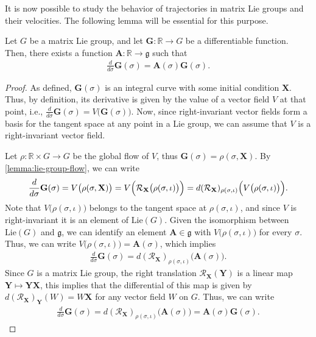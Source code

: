 It is now possible to study the behavior of trajectories in matrix Lie groups and their velocities. The following lemma will be essential for this purpose.
\begin{lemma} \label{lemma:derivative-lie-element-H-parallelizable} Let $G$ be a matrix Lie group, and let $\mathbf{G}:\mathbb{R}\to G$ be a differentiable function. Then, there exists a function $\mathbf{A}:\mathbb{R} \to \mathfrak{g}$ such that 
\begin{align}
    \frac{d}{d\sigma} \mathbf{G}(\sigma) = \mathbf{A}(\sigma) \mathbf{G}(\sigma). \label{eq:derivative-lie-element-H-parallelizable}
\end{align}

\end{lemma}
\begin{proof}
    As defined, $\mathbf{G}(\sigma)$ is an integral curve with some initial condition $\mathbf{X}$. Thus, by definition, its derivative is given by the value of a vector field $V$ at that point, i.e., $\frac{d}{d\sigma}\mathbf{G}(\sigma) = V\bigl(\mathbf{G}(\sigma)\bigr)$. Now, since right-invariant vector fields form a basis for the tangent space at any point in a Lie group, we can assume that $V$ is a right-invariant vector field.

    Let $\rho: \mathbb{R} \times G \to G$ be the global flow of $V$, thus $\mathbf{G}(\sigma) = \rho(\sigma, \mathbf{X})$. By \cref{lemma:lie-group-flow}, we can write
    \begin{align}
        \frac{d}{d\sigma} \mathbf{G}(\sigma) = V\bigl(\rho(\sigma, \mathbf{X})\bigr) = V\Bigl(\mathcal{R}_{\mathbf{X}}\bigl(\rho(\sigma, \iota)\bigr)\Bigr) = d(\mathcal{R}_{\mathbf{X}})_{\rho(\sigma, \iota)}\Bigl(V\bigl(\rho(\sigma, \iota)\bigr)\Bigr).
    \end{align}
    Note that $V\bigl(\rho(\sigma, \iota)\bigr)$ belongs to the tangent space at $\rho(\sigma, \iota)$, and since $V$ is right-invariant it is an element of $\text{Lie}(G)$. Given the isomorphism between $\text{Lie}(G)$ and $\mathfrak{g}$, we can identify an element $\mathbf{A}\in \mathfrak{g}$ with $V\bigl(\rho(\sigma, \iota)\bigr)$ for every $\sigma$. Thus, we can write $V\bigl(\rho(\sigma, \iota)\bigr) = \mathbf{A}(\sigma)$, which implies
    \begin{align}
        \frac{d}{d\sigma} \mathbf{G}(\sigma) = d(\mathcal{R}_{\mathbf{X}})_{\rho(\sigma, \iota)}\bigl(\mathbf{A}(\sigma)\bigr).
    \end{align}
    Since $G$ is a matrix Lie group, the right translation $\mathcal{R}_\mathbf{X}(\mathbf{Y})$ is a linear map $\mathbf{Y}\mapsto \mathbf{Y}\mathbf{X}$, this implies that the differential of this map is given by $d(\mathcal{R}_\mathbf{X})_{\mathbf{Y}}(W) = W\mathbf{X}$ \citep[p. 194]{Lee2012} for any vector field $W$ on $G$. Thus, we can write
    \begin{align}
        \frac{d}{d\sigma} \mathbf{G}(\sigma) = d(\mathcal{R}_{\mathbf{X}})_{\rho(\sigma, \iota)}\bigl(\mathbf{A}(\sigma)\bigr) = \mathbf{A}(\sigma)\mathbf{G}(\sigma).
    \end{align}
\end{proof}

